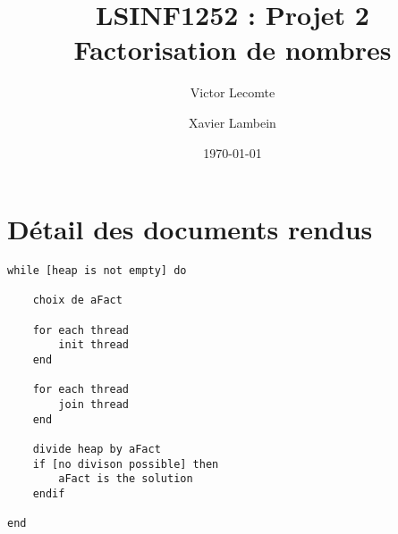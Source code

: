\documentclass[a4paper,12pt]{article}
\title{LSINF1252 : Projet 2 \\
       Factorisation de nombres}
\author{Victor Lecomte \and Xavier Lambein}
\date{\today}
\begin{document}
\maketitle

\section{Détail des documents rendus}

\begin{lstlisting}
while [heap is not empty] do

    choix de aFact

    for each thread
        init thread
    end

    for each thread
        join thread
    end

    divide heap by aFact
    if [no divison possible] then
        aFact is the solution
    endif

end
\end{lstlisting}
\end{document}
